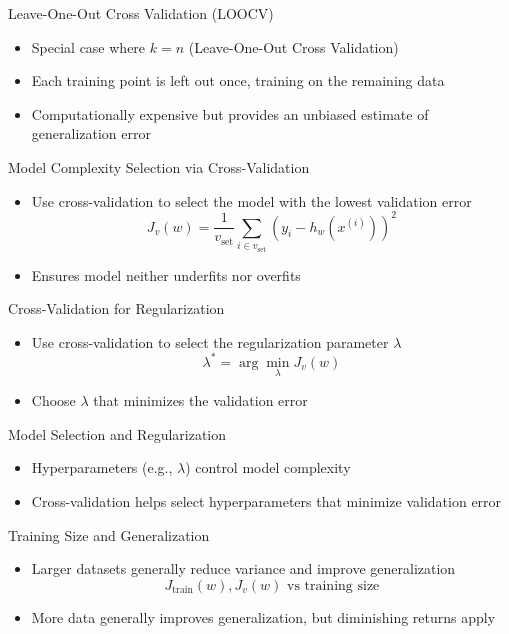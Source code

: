 \documentclass[serif, aspectratio=169]{beamer}
\begin{document}
\begin{frame}{Leave-One-Out Cross Validation (LOOCV)}
  \begin{itemize}
    \item Special case where \( k = n \) (Leave-One-Out Cross Validation)
    \item Each training point is left out once, training on the remaining data
    \item Computationally expensive but provides an unbiased estimate of generalization error
  \end{itemize}
\end{frame}

\begin{frame}{Model Complexity Selection via Cross-Validation}
  \begin{itemize}
    \item Use cross-validation to select the model with the lowest validation error
    \[
    J_v(w) = \frac{1}{v_{\text{set}}} \sum_{i \in v_{\text{set}}} (y_i - h_w(x^{(i)}))^2
    \]
    \item Ensures model neither underfits nor overfits
  \end{itemize}
\end{frame}

\begin{frame}{Cross-Validation for Regularization}
  \begin{itemize}
    \item Use cross-validation to select the regularization parameter \( \lambda \)
    \[
    \lambda^* = \arg \min_{\lambda} J_v(w)
    \]
    \item Choose \( \lambda \) that minimizes the validation error
  \end{itemize}
\end{frame}

\begin{frame}{Model Selection and Regularization}
  \begin{itemize}
    \item Hyperparameters (e.g., \( \lambda \)) control model complexity
    \item Cross-validation helps select hyperparameters that minimize validation error
  \end{itemize}
\end{frame}

\begin{frame}{Training Size and Generalization}
  \begin{itemize}
    \item Larger datasets generally reduce variance and improve generalization
    \[
    J_{\text{train}}(w), J_v(w) \text{ vs training size}
    \]
    \item More data generally improves generalization, but diminishing returns apply
  \end{itemize}
\end{frame}
\end{document}
